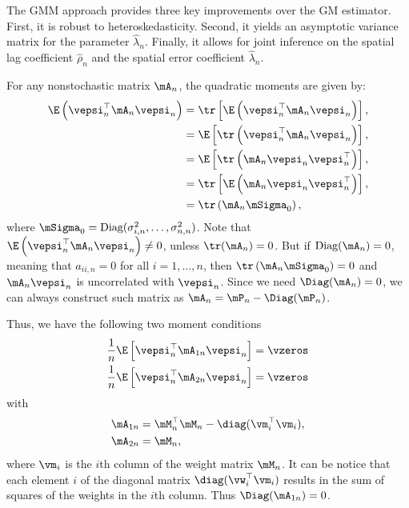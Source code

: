\documentclass[english,12pt]{book}\usepackage[]{graphicx}\usepackage[]{xcolor}
\begin{document}
The GMM approach provides three key improvements over the GM estimator. First, it is robust to heteroskedasticity. Second, it yields an asymptotic variance matrix for the parameter $\widehat{\lambda}_n$. Finally, it allows for joint inference on the spatial lag coefficient $\widehat{\rho}_n$ and the spatial error coefficient $\widehat{\lambda}_n$. 

For any nonstochastic matrix $\mA_{n}$, the quadratic moments are given by:
\begin{equation*}
\begin{aligned}
 \E\left(\vepsi_n^\top \mA_n\vepsi_n\right)& = \tr\left[\E\left(\vepsi_n^\top \mA_n\vepsi_n\right)\right], \\
 & = \E\left[\tr\left(\vepsi_n^\top \mA_n\vepsi_n\right)\right], \\
 & = \E\left[\tr\left(\mA_n\vepsi_n\vepsi_n^\top\right)\right], \\
  & = \tr\left[\E\left(\mA_n\vepsi_n\vepsi_n^\top\right)\right], \\
 & = \tr\left(\mA_n\mSigma_0\right), 
\end{aligned}
\end{equation*}
%
where $\mSigma_0 = \textrm{Diag}(\sigma_{i, n}^2, \ldots, \sigma_{n, n}^2)$. Note that $\E\left(\vepsi_n^\top \mA_n\vepsi_n\right)\neq 0$, unless $\tr(\mA_n) = 0$. But if $\textrm{Diag}(\mA_n) = 0$, meaning that $a_{ii, n} = 0$ for all $i = 1, \ldots, n$, then  $\tr\left(\mA_n\mSigma_0\right) = 0$ and $\mA_n\vepsi_n$ is uncorrelated with $\vepsi_n$. Since we need $\Diag(\mA_n) = 0$, we can always construct such matrix as $\mA_n = \mP_{n} - \Diag(\mP_n)$. 

Thus, we have the following two moment conditions
\begin{equation}\label{eq:moment_conditions_reduced}
	\begin{aligned}
\frac{1}{n}\E\left[\vepsi_n^\top\mA_{1n}\vepsi_n\right] & =  \vzeros \\
\frac{1}{n}\E\left[\vepsi_n^\top\mA_{2n}\vepsi_n\right] & =  \vzeros
	\end{aligned}
\end{equation}
%
with
\begin{equation*}
  \begin{aligned}
\mA_{1n} &= \mM^\top_n\mM_n - \diag(\vm_i^\top\vm_i), \\
\mA_{2n} &= \mM_n,
\end{aligned}
\end{equation*}
%
where $\vm_i$ is the $i$th column of the weight matrix $\mM_n$. It can be notice that  each element $i$ of the diagonal matrix $\diag(\vw_i^\top\vm_i)$ results in the sum of squares of the weights in the $i$th column. Thus $\Diag(\mA_{1n}) = 0$. 
\end{document}

